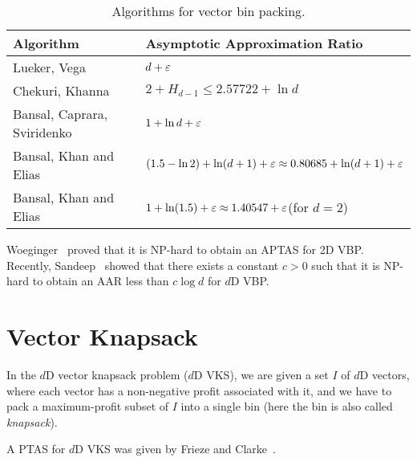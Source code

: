 \begin{table}[ht]
\centering
\caption{Algorithms for vector bin packing.}
\begin{tabular}{ll}
\toprule Algorithm & Asymptotic Approximation Ratio
\\ \midrule Lueker, Vega~\cite{bp-aptas}
    & $d+\varepsilon$
\\[\defaultaddspace] Chekuri, Khanna~\cite{chekuri-khanna-vbp}
    & $2 + H_{d-1} \le 2.57722 + \ln d$
\\[\defaultaddspace] Bansal, Caprara, Sviridenko~\cite{rna}
    & $1 + \ln d + \varepsilon$
\\[\defaultaddspace] Bansal, Khan and Elias~\cite{bansal2016improved}
    & $(1.5 - \ln 2) + \ln(d+1) + \varepsilon \approx 0.80685 + \ln(d+1) + \varepsilon$
\\[\defaultaddspace] Bansal, Khan and Elias~\cite{bansal2016improved}
    & $1 + \ln(1.5) + \varepsilon \approx 1.40547 + \varepsilon$\quad (for $d=2$)
\\ \bottomrule
\end{tabular}
\label{table:vbp}
\end{table}

Woeginger~\cite{woeginger1997there} proved that it is NP-hard to obtain an APTAS for 2D VBP.
Recently, Sandeep~\cite{sandeep2021optimal} showed that there exists a constant $c > 0$ such that
it is NP-hard to obtain an AAR less than $c\log d$ for $d$D VBP.

\section{Vector Knapsack}

In the $d$D vector knapsack problem ($d$D VKS), we are given a set $I$ of $d$D vectors,
where each vector has a non-negative profit associated with it,
and we have to pack a maximum-profit subset of $I$ into a single bin
(here the bin is also called \emph{knapsack}).

A PTAS for $d$D VKS was given by Frieze and Clarke~\cite{frieze1984approximation}.
